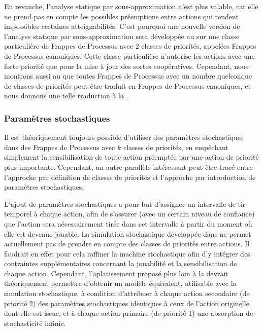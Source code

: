 En revanche, l'analyse statique par sous-approximation n'est plus valable,
car elle ne prend pas en compte les possibles préemptions entre actions qui rendent
impossibles certaines atteignabilités.
C'est pourquoi une nouvelle version de l'analyse statique par sous-approximation sera développée
au 
sur une classe particulière de Frappes de Processus avec 2 classes de priorités, appelées
Frappes de Processus canoniques.
Cette classe particulière n'autorise les actions avec une forte priorité que pour la mise à jour
des sortes coopératives.
Cependant, nous montrons aussi au 
que toutes Frappes de Processus avec un nombre quelconque de classes de priorités peut être traduit
en Frappes de Processus canoniques, et nous donnons une telle traduction à la
.

\subsubsection{Paramètres stochastiques}


Il est théoriquement toujours possible d'utiliser des paramètres stochastiques
dans des Frappes de Processus avec $k$ classes de priorités,
en empêchant simplement la sensibilisation de toute action préemptée par une action
de priorité plus importante.
Cependant, un autre parallèle intéressant peut être tracé entre l'approche
par définition de classes de priorités
et l'approche par introduction de paramètres stochastiques.

L'ajout de paramètres stochastiques a pour but d'assigner un intervalle de tir temporel à
chaque action, afin de s'assurer (avec un certain niveau de confiance) que l'action sera
nécessairement tirée dans cet intervalle à partir du moment où elle est devenue jouable.
La simulation stochastique développée dans 
ne permet actuellement pas de prendre en compte des classes de priorités entre actions.
Il faudrait en effet pour cela raffiner la machine stochastique afin d'y intégrer des contraintes
supplémentaires concernant la jouabilité et la sensibilisation de chaque action.
Cependant, l'aplatissement proposé plus loin à la 
devrait théoriquement permettre d'obtenir un modèle équivalent,
utilisable avec la simulation stochastique, à condition
d'attribuer à chaque action secondaire (\cad de priorité 2)
des paramètres stochastiques identiques à ceux de l'action originelle dont elle est issue,
et à chaque action primaire (\cad de priorité 1) une absorption de stochasticité infinie.

